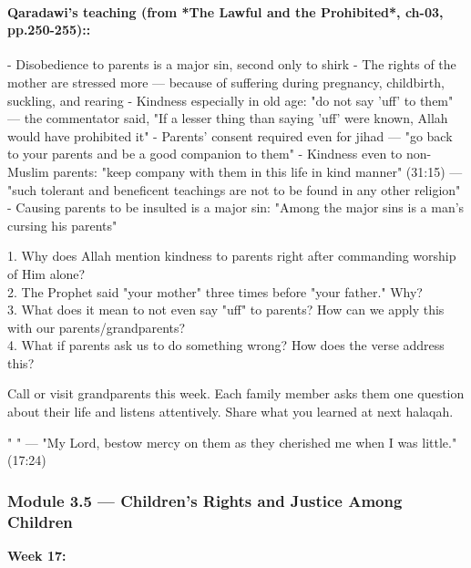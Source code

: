 \documentclass[11pt,a4paper]{article}
\begin{document}
\paragraph*{Qaradawi's teaching (from *The Lawful and the Prohibited*, ch-03, pp.250-255)::}  - Disobedience to parents is a major sin, second only to shirk - The rights of the mother are stressed more --- because of suffering during pregnancy, childbirth, suckling, and rearing - Kindness especially in old age: "do not say 'uff' to them" --- the commentator said, "If a lesser thing than saying 'uff' were known, Allah would have prohibited it" - Parents' consent required even for jihad --- "go back to your parents and be a good companion to them" - Kindness even to non-Muslim parents: "keep company with them in this life in kind manner" (31:15) --- "such tolerant and beneficent teachings are not to be found in any other religion" - Causing parents to be insulted is a major sin: "Among the major sins is a man's cursing his parents"

\begin{discussionbox} 1. Why does Allah mention kindness to parents right after commanding worship of Him alone? \\ 2. The Prophet said "your mother" three times before "your father." Why? \\ 3. What does it mean to not even say "uff" to parents? How can we apply this with our parents/grandparents? \\ 4. What if parents ask us to do something wrong? How does the verse address this? \end{discussionbox}

\begin{activitybox} Call or visit grandparents this week. Each family member asks them one question about their life and listens attentively. Share what you learned at next halaqah. \end{activitybox}

\begin{duabox} "    " --- "My Lord, bestow mercy on them as they cherished me when I was little." (17:24) \end{duabox}

\vspace{6pt}\noindent{\color{border}\rule{\textwidth}{0.5pt}}\vspace{6pt}

\subsubsection*{Module 3.5 --- Children's Rights and Justice Among Children}
\textbf{Week 17:} 
\end{document}
